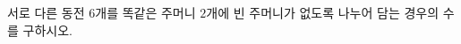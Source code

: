 \hspace*{2mm}\begin{minipage}[t]{\dimexpr\linewidth-2mm\relax}\vspace{0pt}
서로 다른 동전 $6$개를 똑같은 주머니 $2$개에 빈 주머니가 없도록 나누어 담는 경우의 수를 구하시오.\end{minipage}
